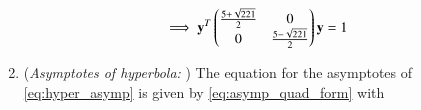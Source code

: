 \begin{enumerate}
\begin{align}
\\
   \implies\mathbf{y}^T\begin{pmatrix}\frac{5+\sqrt{221}}{2} & 0 \\0 & \frac{5-\sqrt{221}}{2}\end{pmatrix}\mathbf{y}&= 1
\end{align}
\item ({\em Asymptotes of hyperbola: })
The equation for the asymptotes of \eqref{eq:hyper_asymp} is given by \eqref{eq:asymp_quad_form} with 


\end{enumerate}
